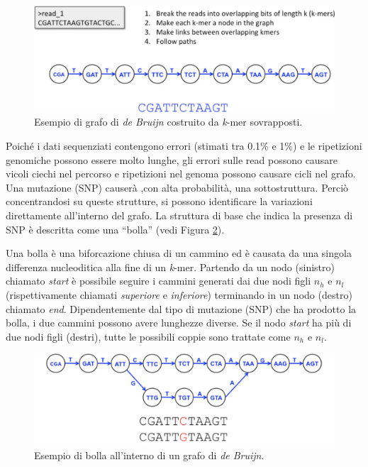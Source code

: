 \documentclass[../main.tex]{subfiles}
\begin{document}
\begin{figure}[h!]
	\centering
  	\captionsetup{justification=centering}
  	\includegraphics[scale=.3]{images/dBG.png}
  	\caption{Esempio di grafo di \textit{de Bruijn} costruito da \textit{k}-mer sovrapposti.}
  	\label{fig:dBG}
\end{figure}

\noindent
Poiché i dati sequenziati contengono errori (stimati tra 0.1\% e 1\%) e le ripetizioni genomiche possono essere molto lunghe, gli errori sulle read possono causare vicoli ciechi nel percorso e ripetizioni nel genoma possono causare cicli nel grafo. Una mutazione (SNP) causerà ,con alta probabilità, una sottostruttura. Perciò concentrandosi su queste strutture, si possono identificare la variazioni direttamente all'interno del grafo. La struttura di base che indica la presenza di SNP è descritta come una ``bolla'' (vedi Figura \ref{fig:dBG_bubble}).

\begin{definition}
\label{def:dBG_bubble}
Una bolla è una biforcazione chiusa di un cammino ed è causata da una singola differenza nucleoditica alla fine di un \textit{k}-mer. Partendo da un nodo (sinistro) chiamato \textit{start} è possibile seguire i cammini generati dai due nodi figli $n_h$ e $n_l$ (rispettivamente chiamati \textit{superiore} e \textit{inferiore}) terminando in un nodo (destro) chiamato \textit{end}. Dipendentemente dal tipo di mutazione (SNP) che ha prodotto la bolla, i due cammini possono avere lunghezze diverse. Se il nodo \textit{start} ha più di due nodi figli (destri), tutte le possibili coppie sono trattate come $n_h$ e $n_l$.
\end{definition}

\begin{figure}[h!]
	\centering
  	\captionsetup{justification=centering}
  	\includegraphics[scale=.3]{images/dBG_bubble.png}
  	\caption{Esempio di bolla all'interno di un grafo di \textit{de Bruijn}.}
  	\label{fig:dBG_bubble}
\end{figure}
\end{document}
